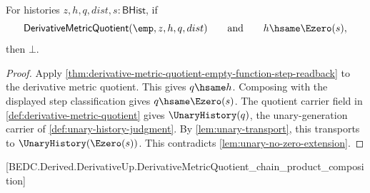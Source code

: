\begin{theorem}
\label{thm:derivative-metric-quotient-empty-function-zero-step-absurd}
For histories $z,h,q,dist,s:\mathsf{BHist}$, if
$$
\mathsf{DerivativeMetricQuotient}(\emp,z,h,q,dist)
\qquad\text{and}\qquad
h\hsame\Ezero(s),
$$
then $\bot$.
\end{theorem}
\begin{proof}
Apply \autoref{thm:derivative-metric-quotient-empty-function-step-readback} to the derivative metric quotient. This gives $q\hsame h$. Composing with the displayed step classification gives $q\hsame\Ezero(s)$. The quotient carrier field in \autoref{def:derivative-metric-quotient} gives $\UnaryHistory(q)$, the unary-generation carrier of \autoref{def:unary-history-judgment}. By \autoref{lem:unary-transport}, this transports to $\UnaryHistory(\Ezero(s))$. This contradicts \autoref{lem:unary-no-zero-extension}.
\end{proof}

[BEDC.Derived.DerivativeUp.DerivativeMetricQuotient\_chain\_product\_composition]

